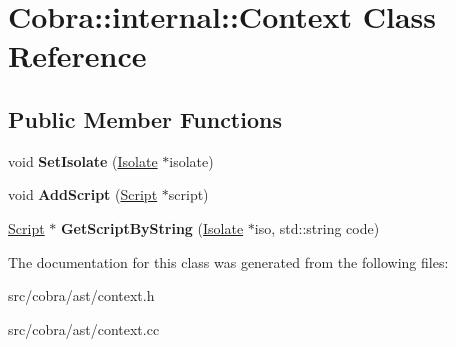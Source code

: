 \hypertarget{class_cobra_1_1internal_1_1_context}{\section{Cobra\+:\+:internal\+:\+:Context Class Reference}
\label{class_cobra_1_1internal_1_1_context}
}
\subsection*{Public Member Functions}
\begin{DoxyCompactItemize}
\item 
\hypertarget{class_cobra_1_1internal_1_1_context_a9ce99f725452c20315f88c9fb0328baa}{void {\bfseries Set\+Isolate} (\hyperlink{class_cobra_1_1internal_1_1_isolate}{Isolate} $\ast$isolate)}\label{class_cobra_1_1internal_1_1_context_a9ce99f725452c20315f88c9fb0328baa}

\item 
\hypertarget{class_cobra_1_1internal_1_1_context_a077c432927bd36374978cf56c55b58e2}{void {\bfseries Add\+Script} (\hyperlink{class_cobra_1_1internal_1_1_script}{Script} $\ast$script)}\label{class_cobra_1_1internal_1_1_context_a077c432927bd36374978cf56c55b58e2}

\item 
\hypertarget{class_cobra_1_1internal_1_1_context_a9128b4d12daae36ec57607d9d7867f6c}{\hyperlink{class_cobra_1_1internal_1_1_script}{Script} $\ast$ {\bfseries Get\+Script\+By\+String} (\hyperlink{class_cobra_1_1internal_1_1_isolate}{Isolate} $\ast$iso, std\+::string code)}\label{class_cobra_1_1internal_1_1_context_a9128b4d12daae36ec57607d9d7867f6c}

\end{DoxyCompactItemize}


The documentation for this class was generated from the following files\+:\begin{DoxyCompactItemize}
\item 
src/cobra/ast/context.\+h\item 
src/cobra/ast/context.\+cc\end{DoxyCompactItemize}
